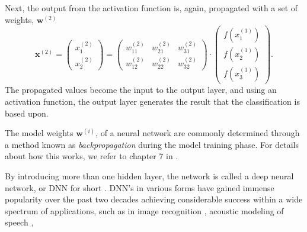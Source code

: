 Next, the output from the activation function is, again, propagated with a set of weights, $\mathbf{w}^{(2)}$
\begin{equation}
	\mathbf{x}^{(2)}=\begin{pmatrix}x_1^{(2)} \\ x_2^{(2)} \end{pmatrix} = 
	\begin{pmatrix} w_{11}^{(2)} & w_{21}^{(2)} & w_{31}^{(2)} \\ w_{12}^{(2)} & w_{22}^{(2)} & w_{32}^{(2)} \end{pmatrix}\cdot \begin{pmatrix}f(x_1^{(1)}) \\ f(x_2^{(1)}) \\ f(x_3^{(1)}) \end{pmatrix}.
\end{equation}
The propagated values become the input to the output layer, and using an activation function, the output layer generates the result that the classification is based upon.

The model weights $\mathbf{w}^{(i)}$, of a neural network are commonly determined through a method known as \textit{backpropagation} during the model training phase. For details about how this works, we refer to chapter 7 in \citep{rojas_1996}.

By introducing more than one hidden layer, the network is called a deep neural network, or DNN for short \citep{hinton_deng_yu_dahl_mohamed_jaitly_senior_vanhoucke_nguyen_sainath_2012}. 
DNN's in various forms have gained immense popularity over the past two decades achieving considerable success within a wide spectrum of applications, such as in image recognition \citep{szegedy_liu_jia_sermanet_reed_anguelov_erhan_vanhoucke_rabinovich_2018}, acoustic modeling of speech \citep{hinton_deng_yu_dahl_mohamed_jaitly_senior_vanhoucke_nguyen_sainath_2012}, 


